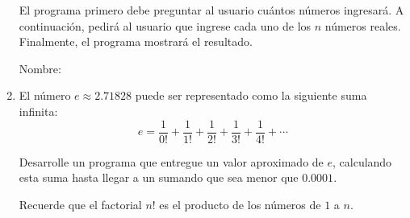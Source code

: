 \documentclass[11pt,spanish]{article}
\newcommand{\onelinerule}{\rule[2.3ex]{0pt}{0pt}}
\newcommand{\nombre}{\framebox[0.8\textwidth]{\onelinerule}}
\newcommand{\pond}[1]%
                     {}
\begin{document}
\begin{enumerate}
        El programa primero debe preguntar al usuario
        cuántos números ingresará.
        A continuación, pedirá al usuario que ingrese
        cada uno de los $n$ números reales.
        Finalmente, el programa mostrará el resultado.

        \framebox[\textwidth]{\rule[39ex]{0pt}{0pt}}
        
      \newpage 
      Nombre: \nombre

      \item\pond{25}
        El número $e\approx 2.71828$
        puede ser representado como la siguiente suma infinita:
        \[
          e =
          \frac{1}{0!} +
          \frac{1}{1!} +
          \frac{1}{2!} +
          \frac{1}{3!} +
          \frac{1}{4!} +
          \cdots
        \]

        Desarrolle un programa que entregue un valor aproximado de $e$,
        calculando esta suma hasta llegar a un sumando
        que sea menor que $0.0001$.

        Recuerde que el factorial $n!$
        es el producto de los números de $1$ a $n$.

        
        \framebox[\textwidth]{\rule[90ex]{0pt}{0pt}}
  \end{enumerate}
\end{document}
